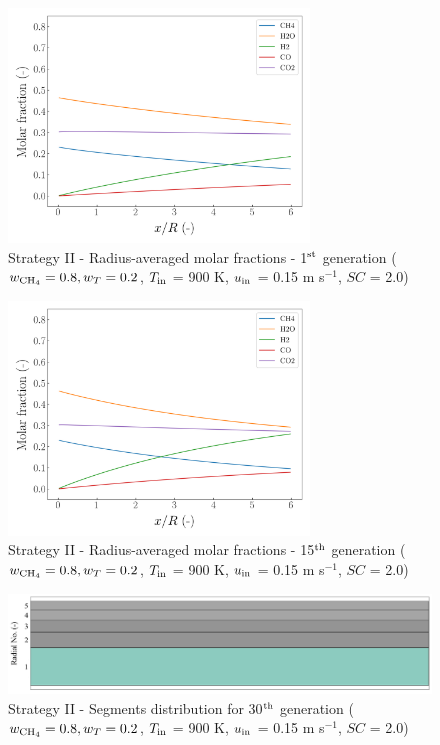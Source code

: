 \documentclass[preprint,12pt]{elsarticle}
\begin{document}
\begin{figure}[h!]
\centering
\includegraphics[width=80mm]{results/5Eq/80C_20T/GEN1-AVG.png}
\caption{\label{fig:5RES8020G1-avg} Strategy II - Radius-averaged molar fractions - 1$^{\rm{st}}$ generation ($w_{\rm{CH_4}} = 0.8, w_T = 0.2$, $T_{\rm{in}}$ = 900 K, $u_{\rm{in}}$ = 0.15 m s$^{-1}$, $SC$ = 2.0)}
\end{figure}

\begin{figure}[h!]
\centering
\includegraphics[width=80mm]{results/5Eq/80C_20T/GEN15-AVG.png}
\caption{\label{fig:5RES8020G15-avg} Strategy II - Radius-averaged molar fractions - 15$^{\rm{th}}$ generation ($w_{\rm{CH_4}} = 0.8, w_T = 0.2$, $T_{\rm{in}}$ = 900 K, $u_{\rm{in}}$ = 0.15 m s$^{-1}$, $SC$ = 2.0)}
\end{figure}

\begin{figure}[h!]
\centering
\includegraphics[width=120mm]{results/segments/5segEq/80C20T/seg.png}
\caption{\label{fig:30L6040G1-TField} Strategy II - Segments distribution for 30$^{\rm{th}}$ generation ($w_{\rm{CH_4}} = 0.8, w_T = 0.2$, $T_{\rm{in}}$ = 900 K, $u_{\rm{in}}$ = 0.15 m s$^{-1}$, $SC$ = 2.0)}
\end{figure}
\end{document}
